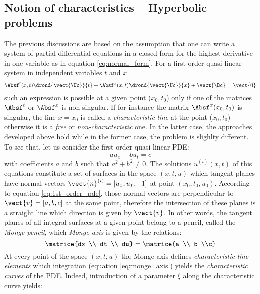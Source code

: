 \subsection{Notion of characteristics -- Hyperbolic problems}
The previous discussions are based on the assumption that one can write a system of partial differential equations in a closed form for the highest derivative in one variable as in equation \eqref{eq:normal_form}. For a first order quasi-linear system in independent variables $t$ and $x$
\begin{equation}
  \label{eq:1st_order_quasilinear_syst}
  \Absf^t(x,t)\drond{\vect{\Uc}}{t} + \Absf^x(x,t) \drond{\vect{\Uc}}{x} + \vect{\Bc} = \vect{0}
\end{equation}
such an expression is possible at a given point ($x_0,t_0$) only if one of the matrices $\Absf^t$ or $\Absf^x$ is non-singular. If for instance the matrix $\Absf^x(x_0,t_0)$ is singular, the line $x=x_0$ is called a \textit{characteristic line} at the point ($x_0,t_0$) otherwise it is a \textit{free} or \textit{non-characteristic} one. In the latter case, the approaches developed above hold while in the former case, the problem is slighlty different. To see that, let us consider the first order quasi-linear PDE:
\begin{equation}
  \label{eq:1st_order_pde}
   a u_x + b u_t  = c
\end{equation}
with coefficients $a$ and $b$ such that $a^2 + b^2 \neq 0$. The solutions $u^{(i)}(x,t)$ of this equations constitute a set of surfaces in the space $(x,t,u)$ which tangent planes have normal vectors $\vect{n}^{(i)}=[u_x,u_t,-1]$ at point $(x_0,t_0,u_0)$. According to equation \eqref{eq:1st_order_pde}, those normal vectors are perpendicular to $\vect{v}=[a,b,c]$ at the same point, therefore the intersection of these planes is a straight line which direction is given by $\vect{v}$. In other words, the tangent planes of all integral surfaces at a given point belong to a pencil, called the \textit{Monge pencil}, which \textit{Monge axis} is given by the relations:
\begin{equation}
  \label{eq:monge_axis}
  \matrice{dx \\ dt \\ du} = \matrice{a \\ b \\c}
\end{equation}
At every point of the space $(x,t,u)$ the Monge axis defines \textit{characteristic line elements} which integration (equation \eqref{eq:monge_axis}) yields the \textit{characteristic curves} of the PDE. Indeed, introduction of a parameter $\xi$ along the characteristic curve yields:
